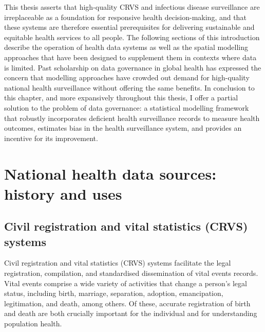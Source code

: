 \documentclass[
]{report}
\begin{document}
This thesis asserts that high-quality CRVS and infectious disease surveillance are irreplaceable as a foundation for responsive health decision-making, and that these systems are therefore essential prerequisites for delivering sustainable and equitable health services to all people. The following sections of this introduction describe the operation of health data systems as well as the spatial modelling approaches that have been designed to supplement them in contexts where data is limited. Past scholarship on data governance in global health has expressed the concern that modelling approaches have crowded out demand for high-quality national health surveillance without offering the same benefits. In conclusion to this chapter, and more expansively throughout this thesis, I offer a partial solution to the problem of data governance: a statistical modelling framework that robustly incorporates deficient health surveillance records to measure health outcomes, estimates bias in the health surveillance system, and provides an incentive for its improvement.

\hypertarget{national-health-data-sources-history-and-uses}{%
\section{National health data sources: history and uses}\label{national-health-data-sources-history-and-uses}}

\hypertarget{civil-registration-and-vital-statistics-crvs-systems}{%
\subsection{Civil registration and vital statistics (CRVS) systems}\label{civil-registration-and-vital-statistics-crvs-systems}}

Civil registration and vital statistics (CRVS) systems facilitate the legal registration, compilation, and standardised dissemination of vital events records. Vital events comprise a wide variety of activities that change a person's legal status, including birth, marriage, separation, adoption, emancipation, legitimation, and death, among others. Of these, accurate registration of birth and death are both crucially important for the individual and for understanding population health.
\end{document}
